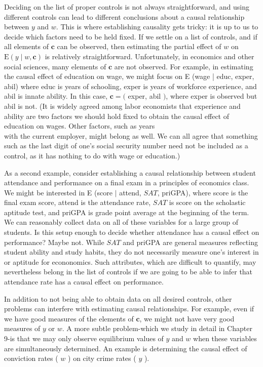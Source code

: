 \documentclass[10pt]{article}
\begin{document}
Deciding on the list of proper controls is not always straightforward, and using different controls can lead to different conclusions about a causal relationship between $y$ and $w$. This is where establishing causality gets tricky: it is up to us to decide which factors need to be held fixed. If we settle on a list of controls, and if all elements of $\mathbf{c}$ can be observed, then estimating the partial effect of $w$ on $\mathrm{E}(y \mid w, \mathbf{c})$ is relatively straightforward. Unfortunately, in economics and other social sciences, many elements of $\mathbf{c}$ are not observed. For example, in estimating the causal effect of education on wage, we might focus on E (wage | educ, exper, abil) where educ is years of schooling, exper is years of workforce experience, and abil is innate ability. In this case, $\mathbf{c}=($ exper, abil $)$, where exper is observed but abil is not. (It is widely agreed among labor economists that experience and ability are two factors we should hold fixed to obtain the causal effect of education on wages. Other factors, such as years\\
with the current employer, might belong as well. We can all agree that something such as the last digit of one's social security number need not be included as a control, as it has nothing to do with wage or education.)

As a second example, consider establishing a causal relationship between student attendance and performance on a final exam in a principles of economics class. We might be interested in E (score $\mid$ attend, $S A T$, priGPA), where score is the final exam score, attend is the attendance rate, $S A T$ is score on the scholastic aptitude test, and priGPA is grade point average at the beginning of the term. We can reasonably collect data on all of these variables for a large group of students. Is this setup enough to decide whether attendance has a causal effect on performance? Maybe not. While $S A T$ and priGPA are general measures reflecting student ability and study habits, they do not necessarily measure one's interest in or aptitude for econonomics. Such attributes, which are difficult to quantify, may nevertheless belong in the list of controls if we are going to be able to infer that attendance rate has a causal effect on performance.

In addition to not being able to obtain data on all desired controls, other problems can interfere with estimating causal relationships. For example, even if we have good measures of the elements of $\mathbf{c}$, we might not have very good measures of $y$ or $w$. A more subtle problem-which we study in detail in Chapter 9-is that we may only observe equilibrium values of $y$ and $w$ when these variables are simultaneously determined. An example is determining the causal effect of conviction rates ( $w$ ) on city crime rates ( $y$ ).
\end{document}
